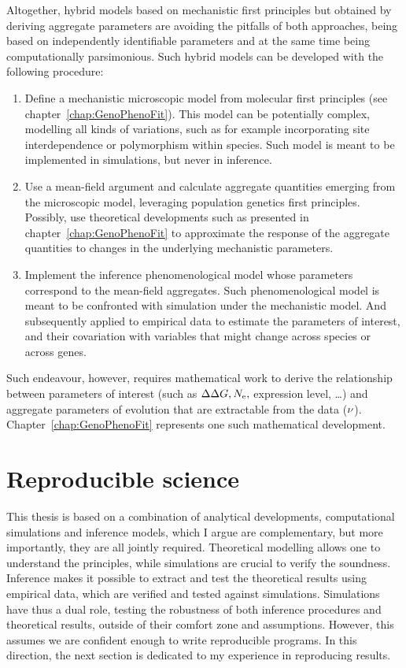 Altogether, hybrid models based on mechanistic first principles but obtained by deriving aggregate parameters are avoiding the pitfalls of both approaches, being based on independently identifiable parameters and at the same time being computationally parsimonious.
Such hybrid models can be developed with the following procedure:
\begin{enumerate}
    \item Define a mechanistic microscopic model from molecular first principles (see chapter~\ref{chap:GenoPhenoFit}).
        This model can be potentially complex, modelling all kinds of variations, such as for example incorporating site interdependence or polymorphism within species.
        Such model is meant to be implemented in simulations, but never in inference.
    \item Use a mean-field argument and calculate aggregate quantities emerging from the microscopic model, leveraging population genetics first principles.
        Possibly, use theoretical developments such as presented in chapter~\ref{chap:GenoPhenoFit} to approximate the response of the aggregate quantities to changes in the underlying mechanistic parameters.
    \item Implement the inference phenomenological model whose parameters correspond to the mean-field aggregates.
        Such phenomenological model is meant to be confronted with simulation under the mechanistic model.
        And subsequently applied to empirical data to estimate the parameters of interest, and their covariation with variables that might change across species or across genes.
\end{enumerate}
Such endeavour, however, requires mathematical work to derive the relationship between parameters of interest (such as $\Delta \Delta G, N_{\text{e}}, $ expression level, \ldots) and aggregate parameters of evolution that are extractable from the data ($\nu$).
Chapter~\ref{chap:GenoPhenoFit} represents one such mathematical development.

\section{Reproducible science}
\label{sec:reproducible-science}

This thesis is based on a combination of analytical developments, computational simulations and inference models, which I argue are complementary, but more importantly, they are all jointly required.
Theoretical modelling allows one to understand the principles, while simulations are crucial to verify the soundness.
Inference makes it possible to extract and test the theoretical results using empirical data, which are verified and tested against simulations.
Simulations have thus a dual role, testing the robustness of both inference procedures and theoretical results, outside of their comfort zone and assumptions.
However, this assumes we are confident enough to write reproducible programs.
In this direction, the next section is dedicated to my experience in reproducing results.

